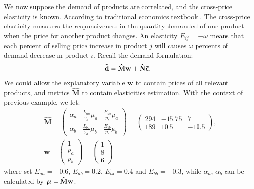 \documentclass[a4paper,11pt]{article}
\begin{document}
We now suppose the demand of products are correlated, and the cross-price elasticity is known. According to traditional economics textbook \cite{Fr08}. The cross-price elasticity measures the responsiveness in the quantity demanded of one product when the price for another product changes. An elasticity $E_{ij} = -\omega$ means that each percent of selling price increase in product $j$ will causes $\omega$ percents of demand decrease in product $i$. Recall the demand formulation:
\[
\mathbf{\tilde{d}} =  \mathbf{\hat{M}} \mathbf{w}
+ \mathbf{\hat{N}} \mbox{\boldmath$\tilde{\epsilon}$}.
\]
We could allow the explanatory variable $\mathbf{w}$ to contain prices of all relevant products, and metrics $\mathbf{\hat{M}}$ to contain elasticities estimation. With the context of previous example, we let:
\[
\begin{aligned}
&\mathbf{\hat{M}} = 
\begin{pmatrix}
\alpha_a&\frac{E_{aa}}{p_a}\mu_a&\frac{E_{ab}}{p_b}\mu_a\\
\alpha_b&\frac{E_{ba}}{p_a}\mu_b&\frac{E_{bb}}{p_b}\mu_b
\end{pmatrix} =
\begin{pmatrix}
294&-15.75&7\\
189&10.5&-10.5
\end{pmatrix},\\
&\mathbf{w} = 
\begin{pmatrix}
1\\
p_a\\
p_b
\end{pmatrix} =
\begin{pmatrix}
1\\
8\\
6
\end{pmatrix}
\end{aligned}
\]
where set $E_{aa} = -0.6$, $E_{ab} = 0.2$, $E_{ba} = 0.4$ and $E_{bb} = -0.3$, while $\alpha_a$, $\alpha_b$ can be calculated by $\mbox{\boldmath$\mu$} = \mathbf{\hat{M}}\mathbf{w}$.
\end{document}
